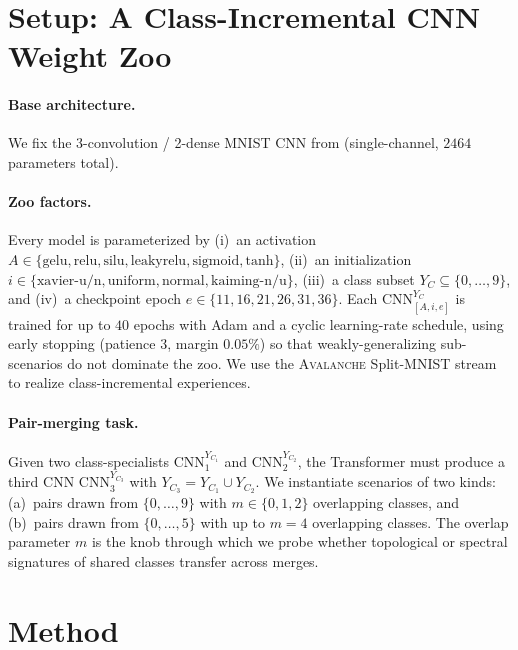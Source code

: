 \documentclass{article}
\begin{document}
\section{Setup: A Class-Incremental CNN Weight Zoo}
\label{sec:setup}

\paragraph{Base architecture.}
We fix the 3-convolution / 2-dense MNIST CNN from
\citet{schurholtHyperRepresentationsLearningPopulations2024}
(single-channel, $2464$ parameters total).

\paragraph{Zoo factors.}
Every model is parameterized by (i)~an activation
$A\in\{\mathrm{gelu},\mathrm{relu},\mathrm{silu},\mathrm{leakyrelu},
\mathrm{sigmoid},\mathrm{tanh}\}$, (ii)~an initialization
$i\in\{\text{xavier-u/n},\text{uniform},\text{normal},\text{kaiming-n/u}\}$,
(iii)~a class subset $Y_C \subseteq\{0,\ldots,9\}$, and (iv)~a checkpoint
epoch $e\in\{11,16,21,26,31,36\}$.  Each $\text{CNN}^{Y_C}_{[A,i,e]}$ is
trained for up to $40$ epochs with Adam and a cyclic learning-rate
schedule, using early stopping (patience $3$, margin $0.05\%$) so that
weakly-generalizing sub-scenarios do not dominate the zoo.  We use the
\textsc{Avalanche} \citep{AvalancheEndtoEndLibrary} Split-MNIST stream to
realize class-incremental experiences.

\paragraph{Pair-merging task.}
Given two class-specialists $\text{CNN}_1^{Y_{C_1}}$ and
$\text{CNN}_2^{Y_{C_2}}$, the Transformer must produce a third CNN
$\text{CNN}_3^{Y_{C_3}}$ with $Y_{C_3}=Y_{C_1}\cup Y_{C_2}$.  We
instantiate scenarios of two kinds: (a)~pairs drawn from $\{0,\ldots,9\}$
with $m\in\{0,1,2\}$ overlapping classes, and (b)~pairs drawn from
$\{0,\ldots,5\}$ with up to $m=4$ overlapping classes.  The overlap
parameter $m$ is the knob through which we probe whether topological or
spectral signatures of shared classes transfer across merges.


\section{Method}
\label{sec:method}
\end{document}
